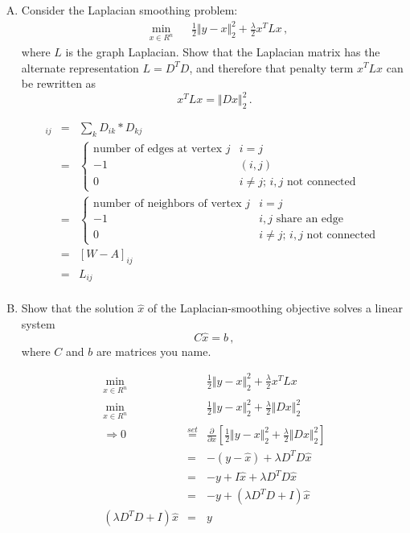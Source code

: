 \documentclass{article}
\begin{document}
\begin{enumerate}[(A)]
\item Consider the Laplacian smoothing problem:
\begin{equation}
\begin{aligned}
& \min_{x \in R^n}
& & 
\frac{1}{2} \Vert y - x \Vert_2^2  + \frac{\lambda}{2} x^T L x \, ,
\end{aligned}
\end{equation}
where $L$ is the graph Laplacian.  Show that the Laplacian matrix has the alternate representation $L = D^T D$, and therefore that penalty term $x^T L x$ can be rewritten as
$$
x^T L x = \Vert D x \Vert_2^2 \, .
$$

\color{blue}
\begin{eqnarray*}
[D^T D]_{ij} 
&=& \sum_k D_{ik}*D_{kj} \\
&=& \begin{cases} \text{number of edges at vertex $j$} & i=j \\ -1 & (i,j) \\  0 & i\ne j ; \,  i,j \text{ not connected } \end{cases}\\
&=& \begin{cases} \text{number of neighbors of vertex $j$} & i=j \\ -1 & i,j \text{ share an edge} \\  0 & i\ne j ; \,  i,j \text{ not connected } \end{cases}\\
&=&[W-A]_{ij}\\
&=& L_{ij} \\
\end{eqnarray*}
\color{black}

\item Show that the solution $\hat{x}$ of the Laplacian-smoothing objective solves a linear system
$$
C \hat{x} = b \, ,
$$
where $C$ and $b$ are matrices you name.

\color{blue}
\begin{eqnarray*}
 \min_{x \in R^n} &&  \frac{1}{2} \Vert y - x \Vert_2^2  + \frac{\lambda}{2} x^T L x \\
 \min_{x \in R^n} &&  \frac{1}{2} \Vert y - x \Vert_2^2  + \frac{\lambda}{2}  \Vert D x \Vert_2^2  \\
\Rightarrow 0 &\stackrel{set}{=}& \frac{\partial}{\partial x} \left[ \frac{1}{2} \Vert y - x \Vert_2^2  + \frac{\lambda}{2}  \Vert D x \Vert_2^2  \right] \\
&=& - (y - \hat{x}) + \lambda D^T D \hat{x}   \\
&=& - y + I\hat{x}  + \lambda D^T D \hat{x}    \\
&=& - y + ( \lambda D^T D + I) \hat{x}    \\
(\lambda D^T D + I) \hat{x} &=&  y      \\
\end{eqnarray*}
\color{black}




\end{enumerate}
\end{document}

